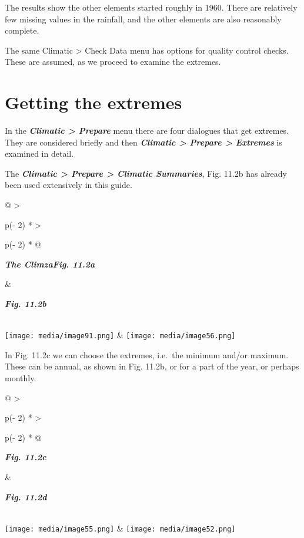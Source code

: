 \documentclass[
  letterpaper,
  DIV=11,
  numbers=noendperiod]{scrreprt}
\begin{document}
The results show the other elements started roughly in 1960. There are
relatively few missing values in the rainfall, and the other elements
are also reasonably complete.

The same Climatic \textgreater{} Check Data menu has options for quality
control checks. These are assumed, as we proceed to examine the
extremes.

\section{Getting the extremes}\label{getting-the-extremes}

In the \textbf{\emph{Climatic \textgreater{} Prepare}} menu there are
four dialogues that get extremes. They are considered briefly and then
\textbf{\emph{Climatic \textgreater{} Prepare \textgreater{} Extremes}}
is examined in detail.

The \textbf{\emph{Climatic \textgreater{} Prepare \textgreater{}
Climatic Summaries}}, Fig. 11.2b has already been used extensively in
this guide.

\begin{longtable}[]{@{}
  >{\raggedright\arraybackslash}p{(\columnwidth - 2\tabcolsep) * }
  >{\raggedright\arraybackslash}p{(\columnwidth - 2\tabcolsep) * }@{}}
\toprule\noalign{}
\begin{minipage}[b]{\linewidth}\raggedright
\textbf{\emph{The ClimzaFig. 11.2a}}
\end{minipage} & \begin{minipage}[b]{\linewidth}\raggedright
\textbf{\emph{Fig. 11.2b}}
\end{minipage} \\
\midrule\noalign{}
\endhead
\bottomrule\noalign{}
\endlastfoot
\texttt{[image: media/image91.png]} &
\texttt{[image: media/image56.png]} \\
\end{longtable}

In Fig. 11.2c we can choose the extremes, i.e.~the minimum and/or
maximum. These can be annual, as shown in Fig. 11.2b, or for a part of
the year, or perhaps monthly.

\begin{longtable}[]{@{}
  >{\raggedright\arraybackslash}p{(\columnwidth - 2\tabcolsep) * }
  >{\raggedright\arraybackslash}p{(\columnwidth - 2\tabcolsep) * }@{}}
\toprule\noalign{}
\begin{minipage}[b]{\linewidth}\raggedright
\textbf{\emph{Fig. 11.2c}}
\end{minipage} & \begin{minipage}[b]{\linewidth}\raggedright
\textbf{\emph{Fig. 11.2d}}
\end{minipage} \\
\midrule\noalign{}
\endhead
\bottomrule\noalign{}
\endlastfoot
\texttt{[image: media/image55.png]} &
\texttt{[image: media/image52.png]} \\
\end{longtable}
\end{document}
